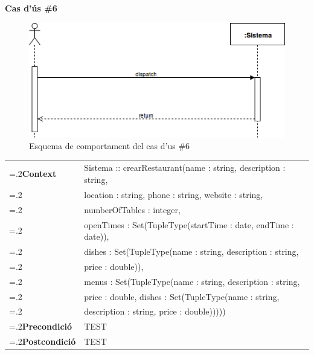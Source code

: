 \noindent\textbf{\large Cas d'ús \#6}\\
\begin{figure}[H]
\centering
\includegraphics[scale=0.6]{Figures/casdus_00.png}
\caption{Esquema de comportament del cas d'us \#6}
\end{figure}
\begin{table}[h]
\noindent
\begin{tabularx}{\linewidth}{
>{\hsize=.2\hsize}X%
>{\hsize=0.8\hsize}X%
}
\textbf{Context} 		& Sistema :: crearRestaurant(name : string, description : string, \\
						& location : string, phone : string, website : string, \\
						& numberOfTables : integer, \\
						& openTimes : Set(TupleType(startTime : date, endTime : date)),\\
						& dishes : Set(TupleType(name : string, description : string, \\
						& price : double)), \\
						& menus : Set(TupleType(name : string, description : string, \\
						& price : double, dishes : Set(TupleType(name : string, \\
						& description : string, price : double))))) \\
\textbf{Precondició} 	& TEST \\
\textbf{Postcondició}	& TEST \\
\end{tabularx}
\label{}
\end{table}

